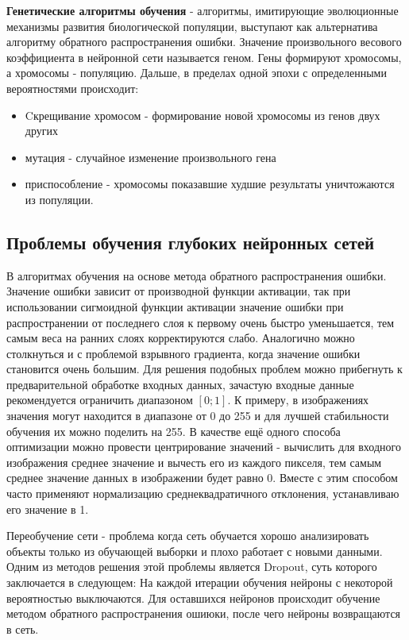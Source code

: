 \textbf{Генетические алгоритмы обучения} - алгоритмы, имитирующие эволюционные механизмы развития биологической популяции, выступают как альтернатива алгоритму обратного распространения ошибки. Значение произвольного весового коэффициента в нейронной сети называется геном. Гены формируют хромосомы, а хромосомы - популяцию. Дальше, в пределах одной эпохи с определенными вероятностями происходит: 
 \begin{itemize}
     \item Cкрещивание хромосом - формирование новой хромосомы из генов двух других
     \item мутация - случайное изменение произвольного гена
     \item приспособление - хромосомы показавшие худшие результаты уничтожаются из популяции.
 \end{itemize}

\subsection{Проблемы обучения глубоких нейронных сетей}

В алгоритмах обучения на основе метода обратного распространения ошибки. Значение ошибки зависит от производной функции активации, так при использовании сигмоидной функции активации значение ошибки при распространении от последнего слоя к первому очень быстро уменьшается, тем самым веса на ранних слоях корректируются слабо. Аналогично можно столкнуться и с проблемой взрывного градиента, когда значение ошибки становится очень большим. 
Для решения подобных проблем можно прибегнуть к предварительной обработке входных данных, зачастую входные данные рекомендуется ограничить диапазоном $[0;1]$. К примеру, в изображениях значения могут находится в диапазоне от 0 до 255 и для лучшей стабильности обучения их можно поделить на 255. В качестве ещё одного способа оптимизации можно провести центрирование значений - вычислить для входного изображения среднее значение и вычесть его из каждого пикселя, тем самым среднее значение данных в изображении будет равно 0. Вместе с этим способом часто применяют нормализацию среднеквадратичного отклонения, устанавливаю его значение в 1.

Переобучение сети - проблема когда сеть обучается хорошо анализировать объекты только из обучающей выборки и плохо работает с новыми данными. Одним из методов решения этой проблемы является Dropout, суть которого заключается в следующем: На каждой итерации обучения нейроны с некоторой вероятностью выключаются. Для оставшихся нейронов происходит обучение методом обратного распространения ошиюки, после чего нейроны возвращаются в сеть. 




\clearpage